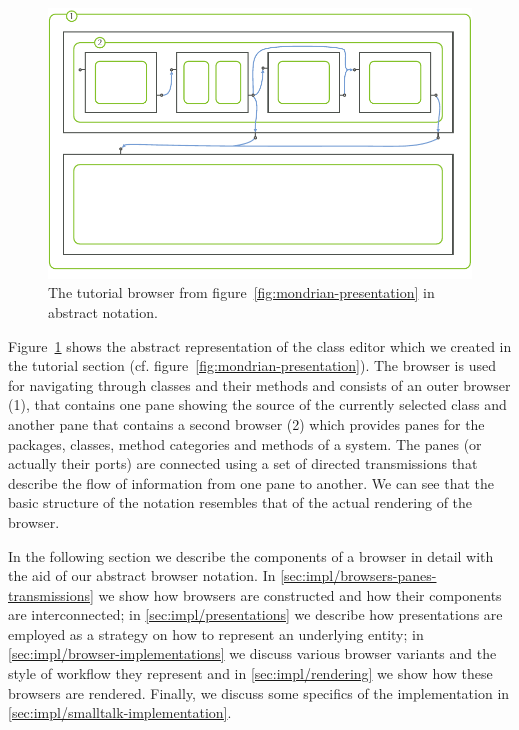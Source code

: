 \documentclass[a4paper,10pt,twoside]{book}
\begin{document}
\begin{figure}[htbp]
\centerline{\includegraphics[width=\linewidth]{schematic_browser.pdf}}
\caption{The tutorial browser from figure~\ref{fig:mondrian-presentation} in abstract notation.}
\label{fig:schematic-browser}
\end{figure}

Figure~\ref{fig:schematic-browser} shows the abstract representation
of the class editor which we created in the tutorial section
(cf. figure~\ref{fig:mondrian-presentation}). The browser is used for
navigating through classes and their methods and consists of an outer
browser (1), that contains one pane showing the source of the
currently selected class and another pane that contains a second
browser (2) which provides panes for the packages, classes, method
categories and methods of a system. The panes (or actually their
ports) are connected using a set of directed transmissions that
describe the flow of information from one pane to another. We can see
that the basic structure of the notation resembles that of the actual
rendering of the browser.

In the following section we describe the components of a browser in
detail with the aid of our abstract browser notation. In
\ref{sec:impl/browsers-panes-transmissions} we show how browsers are
constructed and how their components are interconnected; in
\ref{sec:impl/presentations} we describe how presentations are
employed as a strategy on how to represent an underlying entity; in
\ref{sec:impl/browser-implementations} we discuss various browser
variants and the style of workflow they represent and in
\ref{sec:impl/rendering} we show how these browsers are
rendered. Finally, we discuss some specifics of the implementation in
\ref{sec:impl/smalltalk-implementation}.
\end{document}
